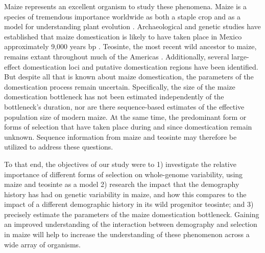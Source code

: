 \documentclass{pnastwo}
\begin{document}
\begin{article}
Maize represents an excellent organism to study these phenomena. Maize is a species of tremendous importance worldwide as both a staple crop \cite{shiferaw2011} and as a model for understanding plant evolution \cite{strable2009}. 
Archaeological and genetic studies have
established that maize domestication is likely to have taken place in
 Mexico approximately 9,000 years bp
\cite{smith1995,matsuoka2002}. Teosinte, the most
recent wild ancestor to maize, remains extant throughout much of the
Americas \cite{wilkes1967}. Additionally, several large-effect
domestication loci \cite{doebley1995, wills2013, wang2015} and putative domestication
regions \cite{hufford2012} have been identified. But despite all that is
known about maize domestication, the parameters of the
domestication process remain uncertain. Specifically, the size of the
maize domestication bottleneck has not been estimated independently of
the bottleneck's duration, nor are there sequence-based estimates of the effective
population size of modern maize. At the same time, the predominant form or forms of selection that have taken place during and since domestication remain unknown. Sequence information from maize and teosinte may therefore be utilized to address these questions.


To that end, the objectives of our study were to 1) investigate the
relative importance of different forms of selection on whole-genome
variability, using maize and teosinte as a model 2) research the impact that the
demography history has had on genetic variability in maize, and how
this compares to the impact of a different demographic history in
its wild progenitor teosinte; and 3) precisely estimate the parameters of the
maize domestication bottleneck. Gaining an improved understanding of the interaction between demography and selection in maize will help to increase the understanding of these phenomenon across a wide array of organisms.





\end{article}
\end{document}
